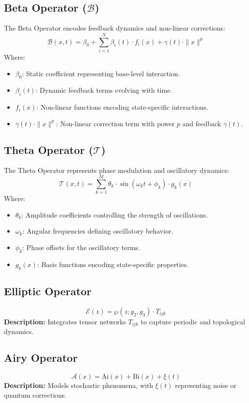 \documentclass{article}
\theoremstyle{plain}
\begin{document}
\begin{itemize}
\subsection{Beta Operator (\( \mathcal{B} \))}
The Beta Operator encodes feedback dynamics and non-linear corrections:
\[
\mathcal{B}(x, t) = \beta_0 + \sum_{i=1}^N \beta_i(t) \cdot f_i(x) + \gamma(t) \cdot \|x\|^p
\]
Where:
\begin{itemize}
    \item \( \beta_0 \): Static coefficient representing base-level interaction.
    \item \( \beta_i(t) \): Dynamic feedback terms evolving with time.
    \item \( f_i(x) \): Non-linear functions encoding state-specific interactions.
    \item \( \gamma(t) \cdot \|x\|^p \): Non-linear correction term with power \( p \) and feedback \( \gamma(t) \).
\end{itemize}

\subsection{Theta Operator (\( \mathcal{T} \))}
The Theta Operator represents phase modulation and oscillatory dynamics:
\[
\mathcal{T}(x, t) = \sum_{k=1}^M \theta_k \cdot \sin(\omega_k t + \phi_k) \cdot g_k(x)
\]
Where:
\begin{itemize}
    \item \( \theta_k \): Amplitude coefficients controlling the strength of oscillations.
    \item \( \omega_k \): Angular frequencies defining oscillatory behavior.
    \item \( \phi_k \): Phase offsets for the oscillatory terms.
    \item \( g_k(x) \): Basis functions encoding state-specific properties.
\end{itemize}

\subsection{Elliptic Operator}
\[
\mathcal{E}(z) = \wp(z; g_2, g_3) \cdot T_{ijk}
\]
\textbf{Description:} Integrates tensor networks $T_{ijk}$ to capture periodic and topological dynamics.

\subsection{Airy Operator}
\[
\mathcal{A}(x) = \text{Ai}(x) + \text{Bi}(x) + \xi(t)
\]
\textbf{Description:} Models stochastic phenomena, with $\xi(t)$ representing noise or quantum corrections.


\end{itemize}
\end{document}
